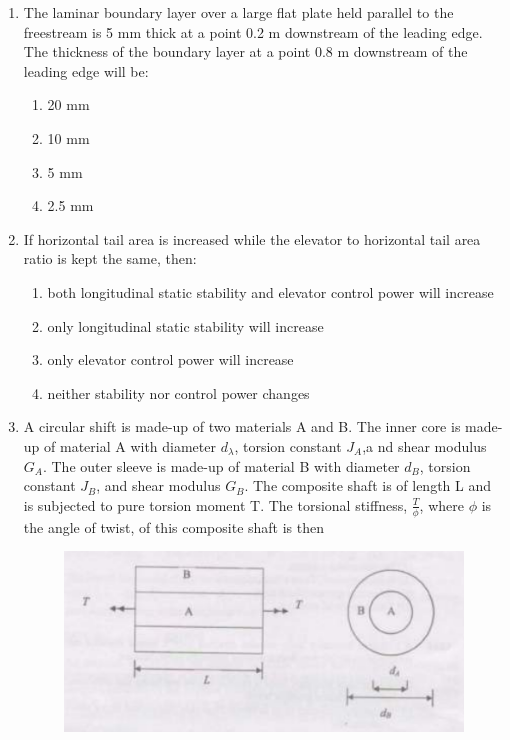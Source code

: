 \documentclass[journal]{IEEEtran}
\numberwithin{equation}{enumi}
\numberwithin{figure}{enumi}
\begin{document}
\begin{enumerate}[start=35]
    \item The laminar boundary layer over a large flat plate held parallel to the freestream is 5 mm thick at a point 0.2 m downstream of the leading edge. The thickness of the boundary layer at a point 0.8 m downstream of the leading edge will be:
    \begin{enumerate}
        \item 20 mm
        \item 10 mm
        \item 5 mm
        \item 2.5 mm
    \end{enumerate}

    \item If horizontal tail area is increased while the elevator to horizontal tail area ratio is kept the same, then:
    \begin{enumerate}
        \item both longitudinal static stability and elevator control power will increase
        \item only longitudinal static stability will increase
        \item only elevator control power will increase
        \item neither stability nor control power changes
    \end{enumerate}

    \item A circular shift is made-up of two materials A and B. The inner core is made-up of material A with diameter $d_\lambda$, torsion constant $J_A$,a nd shear modulus $G_A$. The outer sleeve is made-up of material B with diameter $d_B$, torsion constant $J_B$, and shear modulus $G_B$. The composite shaft is of length L and is subjected to pure torsion moment T. The torsional stiffness, $\frac{T}{\phi}$, where $\phi$ is the angle of twist, of this composite shaft is then
        \begin{figure}[h]
        \centering
       \includegraphics[width=0.7\linewidth]{figs/fig1.png}
       \caption{}
       \end{figure}
    

\end{enumerate}
\end{document}
